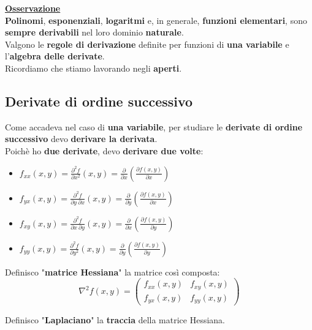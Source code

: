 \documentclass[a4paper, oneside]{article}
\newcommand\de{\partial}
\begin{document}
    \noindent\textbf{\underline{Osservazione}}\\
    \textbf{Polinomi}, \textbf{esponenziali}, \textbf{logaritmi} e, in generale, \textbf{funzioni elementari}, sono \textbf{sempre derivabili} nel loro dominio \textbf{naturale}.\\
    Valgono le \textbf{regole di derivazione} definite per funzioni di \textbf{una variabile} e l'\textbf{algebra delle derivate}. \\
    Ricordiamo che stiamo lavorando negli \textbf{aperti}.

    \subsection{Derivate di ordine successivo}

    Come accadeva nel caso di \textbf{una variabile}, per studiare le \textbf{derivate di ordine successivo} devo \textbf{derivare la derivata}. \\
    Poichè ho \textbf{due derivate}, devo \textbf{derivare due volte}:
    \begin{itemize}
        \item $\displaystyle f_{xx}(x,y) = \frac{\de^2 f}{\de x^2} (x,y) = \frac{\de}{\de x}\left(\frac{\de f(x,y)}{\de x}\right)$
        \item $\displaystyle f_{yx}(x,y) =\frac{\de^2 f}{\de y \ \de x} (x,y) = \frac{\de}{\de y}\left(\frac{\de f(x,y)}{\de x}\right)$
        \item $\displaystyle f_{xy}(x,y) =\frac{\de^2 f}{\de x \ \de y} (x,y) = \frac{\de}{\de x}\left(\frac{\de f(x,y)}{\de y}\right)$
        \item $\displaystyle f_{yy}(x,y) =\frac{\de^2 f}{\de y^2} (x,y) = \frac{\de}{\de y}\left(\frac{\de f(x,y)}{\de y}\right)$
    \end{itemize}

    \begin{definition}
        Definisco "\textbf{matrice Hessiana}" la matrice così composta:
        \[\nabla^2 f(x,y) = \begin{pmatrix}
            f_{xx}(x,y) & f_{xy}(x,y) \\
            f_{yx}(x,y) & f_{yy}(x,y)
        \end{pmatrix}\]
    \end{definition}

    \begin{definition}
        Definisco "\textbf{Laplaciano}" la \textbf{traccia} della matrice Hessiana.
    \end{definition}
\end{document}
